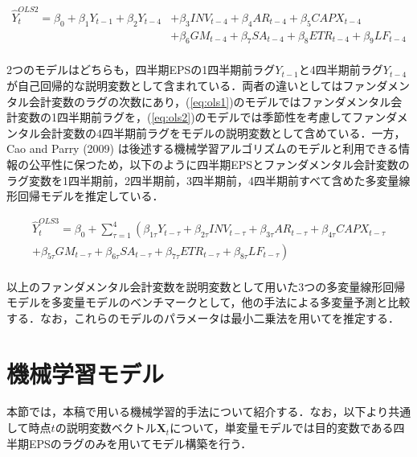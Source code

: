 \documentclass[a4paper，12pt]{jsarticle}
\begin{document}
\begin{equation}
  \begin{split}
    \label{eq:ols2}
    \hat{Y}_t^{OLS2} = \beta_0 + \beta_1Y_{t-1} + \beta_2Y_{t-4} 
    &+ \beta_3INV_{t-4} + \beta_4AR_{t-4} + \beta_5CAPX_{t-4} \\
    &+ \beta_6GM_{t-4} + \beta_7SA_{t-4} + \beta_8ETR_{t-4} + \beta_9LF_{t-4} \\
  \end{split}
\end{equation}

2つのモデルはどちらも，四半期EPSの1四半期前ラグ$Y_{t-1}$と4四半期前ラグ$Y_{t-4}$が自己回帰的な説明変数として含まれている．両者の違いとしてはファンダメンタル会計変数のラグの次数にあり，(\ref{eq:ols1})のモデルではファンダメンタル会計変数の1四半期前ラグを，(\ref{eq:ols2})のモデルでは季節性を考慮してファンダメンタル会計変数の4四半期前ラグをモデルの説明変数として含めている．一方，Cao and Parry (2009) は後述する機械学習アルゴリズムのモデルと利用できる情報の公平性に保つため，以下のように四半期EPSとファンダメンタル会計変数のラグ変数を1四半期前，2四半期前，3四半期前，4四半期前すべて含めた多変量線形回帰モデルを推定している．

\begin{equation}
  \begin{split}
    \label{eq:ols3}
    \hat{Y}_t^{OLS3} = \beta_0 + \sum^{4}_{\tau=1} \left( \beta_{1\tau}Y_{t-\tau} 
    + \beta_{2\tau}INV_{t-\tau} + \beta_{3\tau}AR_{t-\tau} + \beta_{4\tau}CAPX_{t-\tau} \right.\\
    \left.+ \beta_{5\tau}GM_{t-\tau} + \beta_{6\tau}SA_{t-\tau} + \beta_{7\tau}ETR_{t-\tau} + \beta_{8\tau}LF_{t-\tau} \right) \\
  \end{split}
\end{equation}

以上のファンダメンタル会計変数を説明変数として用いた3つの多変量線形回帰モデルを多変量モデルのベンチマークとして，他の手法による多変量予測と比較する．なお，これらのモデルのパラメータは最小二乗法を用いてを推定する．

\section{機械学習モデル}

本節では，本稿で用いる機械学習的手法について紹介する．なお，以下より共通して時点$t$の説明変数ベクトル$\bm{X}_t$について，単変量モデルでは目的変数である四半期EPSのラグのみを用いてモデル構築を行う．
\end{document}
